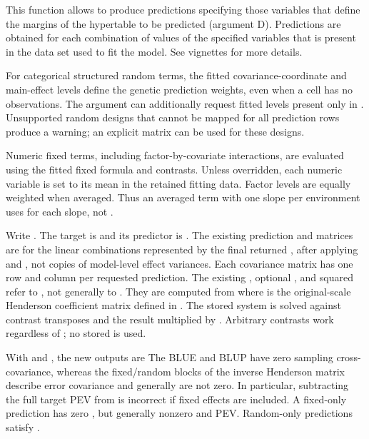 \documentclass[a4paper]{book}
\begin{document}
\begin{Details}\relax
This function allows to produce predictions specifying those variables that define the margins of the hypertable to be predicted (argument D). Predictions are obtained for each combination of values of the specified variables that is present in the data set used to fit the model. See vignettes for more details. 

For categorical structured random terms, the fitted covariance-coordinate
and main-effect levels define the genetic prediction weights, even when a
cell has no observations. The  argument can additionally request
fitted levels present only in . Unsupported random designs that
cannot be mapped for all prediction rows produce a warning; an explicit
 matrix can be used for these designs.

Numeric fixed terms, including factor-by-covariate interactions, are
evaluated using the fitted fixed formula and contrasts. Unless overridden,
each numeric variable is set to its mean in the retained fitting data.
Factor levels are equally weighted when averaged. Thus an averaged
 term with one slope per environment uses
 for each slope, not .

Write . The target is  and its
predictor is . The existing
prediction  and  matrices are for the linear
combinations represented by the final returned , after applying
 and , not copies of model-level effect variances.
Each covariance matrix has one row and column per requested prediction.
The existing
, optional , and squared  refer to
, not generally to
. They are computed from
where  is the original-scale Henderson coefficient matrix defined
in . The stored system  is solved against
contrast transposes and the result multiplied by . Arbitrary
contrasts work regardless of ; no stored  is used.

With  and , the new outputs are
The BLUE and BLUP have zero sampling cross-covariance, whereas the
fixed/random blocks of the inverse Henderson matrix describe error
covariance and generally are not zero. In particular, subtracting the full
target PEV from  is incorrect if fixed effects are included.
A fixed-only prediction has zero , but generally nonzero
 and PEV. Random-only predictions satisfy
.


\end{Details}
\end{document}

